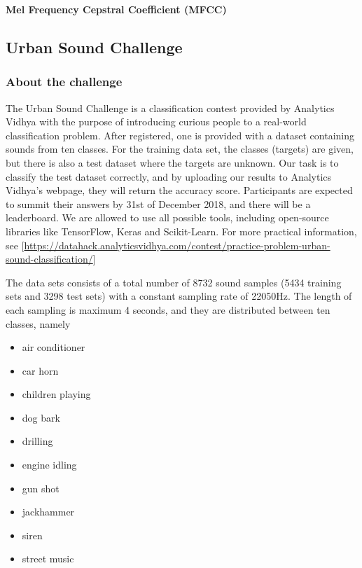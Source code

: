 \textbf{Mel Frequency Cepstral Coefficient (MFCC)}

\subsection{Urban Sound Challenge}
\subsubsection{About the challenge}
The Urban Sound Challenge is a classification contest provided by Analytics Vidhya with the purpose of introducing curious people to a real-world classification problem. After registered, one is provided with a dataset containing sounds from ten classes. For the training data set, the classes (targets) are given, but there is also a test dataset where the targets are unknown. Our task is to classify the test dataset correctly, and by uploading our results to Analytics Vidhya's webpage, they will return the accuracy score. Participants are expected to summit their answers by 31st of December 2018, and there will be a leaderboard. We are allowed to use all possible tools, including open-source libraries like TensorFlow, Keras and Scikit-Learn. For more practical information, see [\url{https://datahack.analyticsvidhya.com/contest/practice-problem-urban-sound-classification/}]

The data sets consists of a total number of 8732 sound samples (5434 training sets and 3298 test sets) with a constant sampling rate of 22050Hz. The length of each sampling is maximum 4 seconds, and they are distributed between ten classes, namely
\begin{multicols}{2}
\begin{itemize}
	\setlength\itemsep{0.2em}
	\item air conditioner
	\item car horn
	\item children playing
	\item dog bark
	\item drilling
\end{itemize}

\columnbreak

\begin{itemize}
	\setlength\itemsep{0.2em}
	\item engine idling
	\item gun shot
	\item jackhammer
	\item siren
	\item street music
\end{itemize}
\end{multicols}

